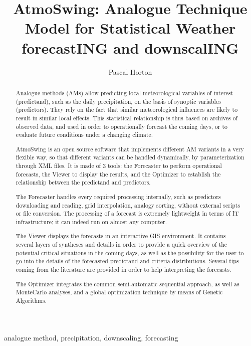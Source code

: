 \documentclass[review]{elsarticle}
\begin{document}
\begin{frontmatter}

\title{AtmoSwing: Analogue Technique Model for Statistical Weather forecastING and downscalING}


\author[unibe,unil,terranum]{Pascal Horton}


\address[unibe]{University of Bern, Oeschger Centre for Climate Change Research, Institute of Geography, Bern, Switzerland}
\address[unil]{University of Lausanne, Institute of Earth Sciences, Lausanne, Switzerland}
\address[terranum]{Terranum SARL, Bussigny, Switzerland}



\begin{abstract}
Analogue methods (AMs) allow predicting local meteorological variables of interest (predictand), such as the daily precipitation, on the basis of synoptic variables (predictors). They rely on the fact that similar meteorological influences are likely to result in similar local effects. This statistical relationship is thus based on archives of observed data, and used in order to operationally forecast the coming days, or to evaluate future conditions under a changing climate.

AtmoSwing is an open source software that implements different AM variants in a very flexible way, so that different variants can be handled dynamically, by parameterization through XML files. It is made of 3 tools: the Forecaster to perform operational forecasts, the Viewer to display the results, and the Optimizer to establish the relationship between the predictand and predictors. 

The Forecaster handles every required processing internally, such as predictors downloading and reading, grid interpolation, analogy sorting, without external scripts or file conversion. The processing of a forecast is extremely lightweight in terms of IT infrastructure; it can indeed run on almost any computer.

The Viewer displays the forecasts in an interactive GIS environment. It contains several layers of syntheses and details in order to provide a quick overview of the potential critical situations in the coming days, as well as the possibility for the user to go into the details of the forecasted predictand and criteria distributions. Several tips coming from the literature are provided in order to help interpreting the forecasts.

The Optimizer integrates the common semi-automatic sequential approach, as well as Monte\textendash Carlo analyses, and a global optimization technique by means of Genetic Algorithms. 

\end{abstract}

\begin{keyword}
analogue method, precipitation, downscaling, forecasting
\end{keyword}

\end{frontmatter}
\end{document}
